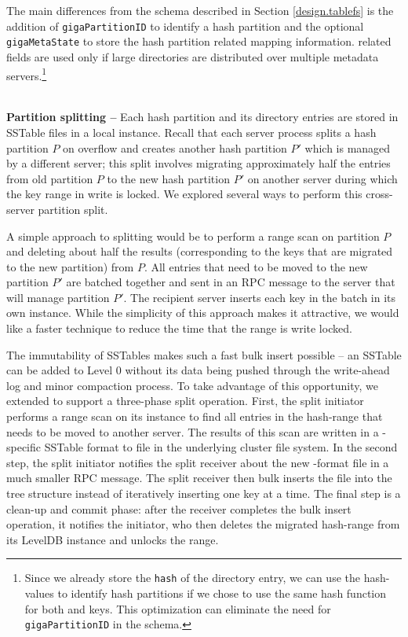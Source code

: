 The main differences from the \ldb{} schema described in Section
\ref{design.tablefs} is the addition of \texttt{gigaPartitionID} to identify a
\giga{} hash partition and the optional \texttt{gigaMetaState} to store the
hash partition related mapping information. \giga{} related fields are used
only if large directories are distributed over multiple metadata servers.\footnote{
Since we already store the \texttt{hash} of the directory entry, we can use the
hash-values to identify hash partitions if we chose to use the same hash
function for both \giga and \ldb keys. This optimization can eliminate the
need for \texttt{gigaPartitionID} in the schema.} 

~\\
\textbf{Partition splitting -- }
Each \giga{} hash partition and its directory entries are stored in 
SSTable files in a local \ldb{} instance. 
Recall that each \giga{} server process splits a hash partition $P$ on 
overflow and creates another hash partition $P'$ which is managed by a 
different server; this split involves migrating approximately half the entries 
from old partition $P$ to the new hash partition $P'$ on another server during
which the key range in write is locked.
We explored several ways to perform this cross-server partition split.

A simple approach to splitting would be to perform a \ldb range scan on 
partition $P$ and deleting about half the results (corresponding to the keys
that are migrated to the new partition) from $P$. 
All entries that need to be moved to the new partition $P'$ are batched
together and sent in an RPC message to the server that will manage partition 
$P'$.
The recipient server inserts each key in the batch in its own \ldb{}
instance. While the simplicity of this approach makes it attractive, we would
like a faster technique to reduce the time that the range is write locked. 

The immutability of \ldb SSTables makes such a fast bulk insert possible -- an
SSTable can be added to Level 0 without its data being pushed through the
write-ahead log and minor compaction process.
To take advantage of this opportunity, we extended \ldb{}
to support a three-phase split operation. 
First, the split initiator performs a range scan on its \ldb{} instance to find all
entries in the hash-range that needs to be moved to another server. The results
of this scan are written in a \ldb{}-specific SSTable format to file in the
underlying cluster file system. 
In the second step, the split initiator notifies the split receiver about
the new \ldb{}-format file in a much smaller RPC message.
The split receiver then bulk inserts the file into the \ldb{} tree structure 
instead of iteratively inserting one key at a time.
The final step is a clean-up and commit phase: after the receiver completes the 
bulk insert operation, it notifies the 
initiator, who then deletes the migrated hash-range from its LevelDB instance
and unlocks the range.%

